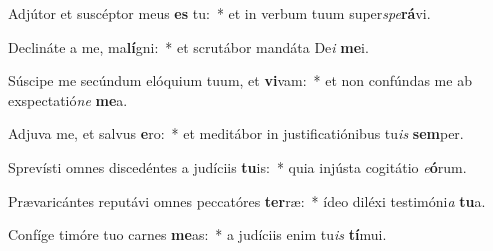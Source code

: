 \item Adjútor et suscéptor meus \textbf{es} tu:~* et in verbum tuum super\textit{spe}\textbf{rá}vi.
\item Declináte a me, ma\textbf{lí}gni:~* et scrutábor mandáta De\textit{i} \textbf{me}i.
\item Súscipe me secúndum elóquium tuum, et \textbf{vi}vam:~* et non confúndas me ab exspectatió\textit{ne} \textbf{me}a.
\item Adjuva me, et salvus \textbf{e}ro:~* et meditábor in justificatiónibus tu\textit{is} \textbf{sem}per.
\item Sprevísti omnes discedéntes a judíciis \textbf{tu}is:~* quia injústa cogitátio \textit{e}\textbf{ó}rum.
\item Prævaricántes reputávi omnes peccatóres \textbf{ter}ræ:~* ídeo diléxi testimóni\textit{a} \textbf{tu}a.
\item Confíge timóre tuo carnes \textbf{me}as:~* a judíciis enim tu\textit{is} \textbf{tí}mui.
